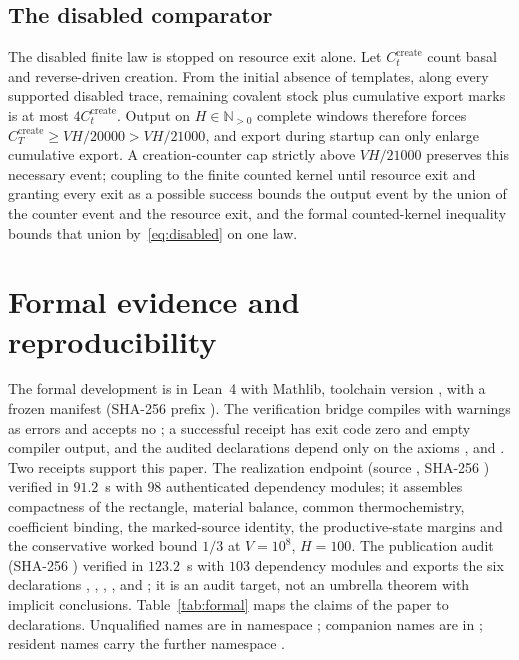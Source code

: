 \documentclass[11pt,a4paper]{article}
\theoremstyle{plain}
\theoremstyle{definition}
\theoremstyle{remark}
\newcommand{\N}{\mathbb N}
\begin{document}
\subsection{The disabled comparator}
The disabled finite law is stopped on resource exit alone. Let $C^{\mathrm{create}}_t$ count basal and reverse-driven creation. From the initial absence of templates, along every supported disabled trace, remaining covalent stock plus cumulative export marks is at most $4C^{\mathrm{create}}_t$. Output on $H\in\N_{>0}$ complete windows therefore forces $C^{\mathrm{create}}_T\ge VH/20000>VH/21000$, and export during startup can only enlarge cumulative export. A creation-counter cap strictly above $VH/21000$ preserves this necessary event; coupling to the finite counted kernel until resource exit and granting every exit as a possible success bounds the output event by the union of the counter event and the resource exit, and the formal counted-kernel inequality bounds that union by~\eqref{eq:disabled} on one law.

\section{Formal evidence and reproducibility}\label{app:formal}
The formal development is in Lean~4 with Mathlib, toolchain version , with a frozen manifest (SHA-256 prefix ). The verification bridge compiles with warnings as errors and accepts no ; a successful receipt has exit code zero and empty compiler output, and the audited declarations depend only on the axioms ,  and . Two receipts support this paper. The realization endpoint  (source , SHA-256 ) verified in $91.2$~s with $98$ authenticated dependency modules; it assembles compactness of the rectangle, material balance, common thermochemistry, coefficient binding, the marked-source identity, the productive-state margins and the conservative worked bound $1/3$ at $V=10^8$, $H=100$. The publication audit  (SHA-256 ) verified in $123.2$~s with $103$ dependency modules and exports the six declarations , , , ,  and ; it is an audit target, not an umbrella theorem with implicit conclusions. Table~\ref{tab:formal} maps the claims of the paper to declarations. Unqualified names are in namespace ; companion names are in ; resident names carry the further namespace .
\end{document}
